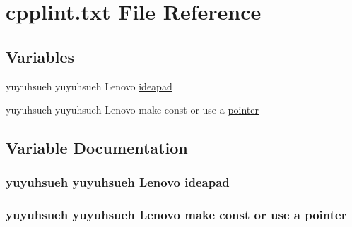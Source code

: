 \hypertarget{cpplint_8txt}{}\section{cpplint.\+txt File Reference}
\label{cpplint_8txt}
\subsection*{Variables}
\begin{DoxyCompactItemize}
\item 
yuyuhsueh yuyuhsueh Lenovo \hyperlink{cpplint_8txt_a3d26b1b77481d7e368bb223610de8603}{ideapad}
\item 
yuyuhsueh yuyuhsueh Lenovo make const or use a \hyperlink{cpplint_8txt_a127844d2149371fa36c108b950beca56}{pointer}
\end{DoxyCompactItemize}


\subsection{Variable Documentation}
\subsubsection[{\texorpdfstring{ideapad}{ideapad}}]{\setlength{\rightskip}{0pt plus 5cm}yuyuhsueh yuyuhsueh Lenovo ideapad}\hypertarget{cpplint_8txt_a3d26b1b77481d7e368bb223610de8603}{}\label{cpplint_8txt_a3d26b1b77481d7e368bb223610de8603}
\subsubsection[{\texorpdfstring{pointer}{pointer}}]{\setlength{\rightskip}{0pt plus 5cm}yuyuhsueh yuyuhsueh Lenovo make const or use a pointer}\hypertarget{cpplint_8txt_a127844d2149371fa36c108b950beca56}{}\label{cpplint_8txt_a127844d2149371fa36c108b950beca56}
